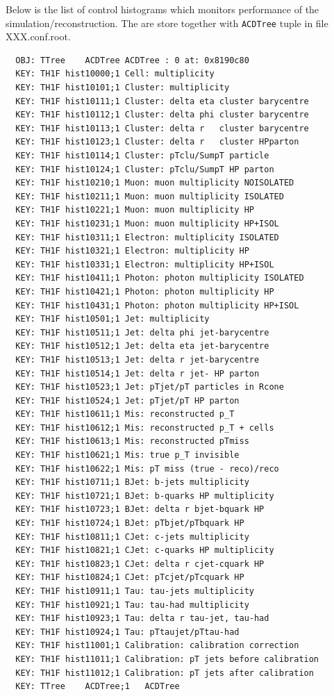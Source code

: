 Below is the list of control histograms which monitors performance of
the simulation/reconstruction. The are store together with {\tt ACDTree}
tuple in file XXX.conf.root.
\scriptsize{
\begin{verbatim}  
  OBJ: TTree	ACDTree	ACDTree : 0 at: 0x8190c80
  KEY: TH1F	hist10000;1	Cell: multiplicity
  KEY: TH1F	hist10101;1	Cluster: multiplicity
  KEY: TH1F	hist10111;1	Cluster: delta eta cluster barycentre
  KEY: TH1F	hist10112;1	Cluster: delta phi cluster barycentre
  KEY: TH1F	hist10113;1	Cluster: delta r   cluster barycentre
  KEY: TH1F	hist10123;1	Cluster: delta r   cluster HPparton
  KEY: TH1F	hist10114;1	Cluster: pTclu/SumpT particle
  KEY: TH1F	hist10124;1	Cluster: pTclu/SumpT HP parton
  KEY: TH1F	hist10210;1	Muon: muon multiplicity NOISOLATED
  KEY: TH1F	hist10211;1	Muon: muon multiplicity ISOLATED
  KEY: TH1F	hist10221;1	Muon: muon multiplicity HP
  KEY: TH1F	hist10231;1	Muon: muon multiplicity HP+ISOL
  KEY: TH1F	hist10311;1	Electron: multiplicity ISOLATED
  KEY: TH1F	hist10321;1	Electron: multiplicity HP
  KEY: TH1F	hist10331;1	Electron: multiplicity HP+ISOL
  KEY: TH1F	hist10411;1	Photon: photon multiplicity ISOLATED
  KEY: TH1F	hist10421;1	Photon: photon multiplicity HP
  KEY: TH1F	hist10431;1	Photon: photon multiplicity HP+ISOL
  KEY: TH1F	hist10501;1	Jet: multiplicity
  KEY: TH1F	hist10511;1	Jet: delta phi jet-barycentre
  KEY: TH1F	hist10512;1	Jet: delta eta jet-barycentre
  KEY: TH1F	hist10513;1	Jet: delta r jet-barycentre
  KEY: TH1F	hist10514;1	Jet: delta r jet- HP parton
  KEY: TH1F	hist10523;1	Jet: pTjet/pT particles in Rcone
  KEY: TH1F	hist10524;1	Jet: pTjet/pT HP parton
  KEY: TH1F	hist10611;1	Mis: reconstructed p_T 
  KEY: TH1F	hist10612;1	Mis: reconstructed p_T + cells
  KEY: TH1F	hist10613;1	Mis: reconstructed pTmiss
  KEY: TH1F	hist10621;1	Mis: true p_T invisible
  KEY: TH1F	hist10622;1	Mis: pT miss (true - reco)/reco 
  KEY: TH1F	hist10711;1	BJet: b-jets multiplicity
  KEY: TH1F	hist10721;1	BJet: b-quarks HP multiplicity
  KEY: TH1F	hist10723;1	BJet: delta r bjet-bquark HP
  KEY: TH1F	hist10724;1	BJet: pTbjet/pTbquark HP
  KEY: TH1F	hist10811;1	CJet: c-jets multiplicity
  KEY: TH1F	hist10821;1	CJet: c-quarks HP multiplicity
  KEY: TH1F	hist10823;1	CJet: delta r cjet-cquark HP
  KEY: TH1F	hist10824;1	CJet: pTcjet/pTcquark HP
  KEY: TH1F	hist10911;1	Tau: tau-jets multiplicity
  KEY: TH1F	hist10921;1	Tau: tau-had multiplicity 
  KEY: TH1F	hist10923;1	Tau: delta r tau-jet, tau-had 
  KEY: TH1F	hist10924;1	Tau: pTtaujet/pTtau-had 
  KEY: TH1F	hist11001;1	Calibration: calibration correction
  KEY: TH1F	hist11011;1	Calibration: pT jets before calibration
  KEY: TH1F	hist11012;1	Calibration: pT jets after calibration
  KEY: TTree	ACDTree;1	ACDTree
\end{verbatim}  
}




















